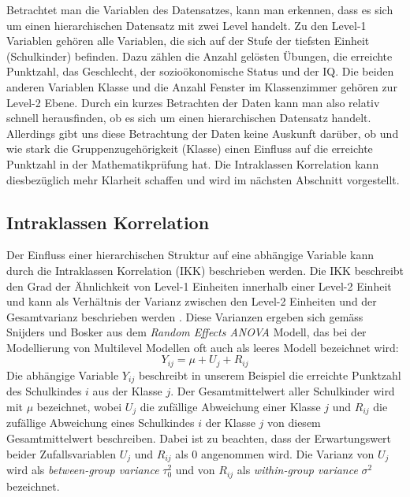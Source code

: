 \documentclass[12pt, a4paper]{article}\usepackage[]{graphicx}\usepackage[]{color}
\begin{document}
Betrachtet man die Variablen des Datensatzes, kann man erkennen, dass es sich um einen hierarchischen Datensatz mit zwei Level handelt. Zu den Level-1 Variablen gehören alle Variablen, die sich auf der Stufe der tiefsten Einheit (Schulkinder) befinden. Dazu zählen die Anzahl gelösten Übungen, die erreichte Punktzahl, das Geschlecht, der sozioökonomische Status und der IQ. Die beiden anderen Variablen Klasse und die Anzahl Fenster im Klassenzimmer gehören zur Level-2 Ebene. Durch ein kurzes Betrachten der Daten kann man also relativ schnell herausfinden, ob es sich um einen hierarchischen Datensatz handelt. Allerdings gibt uns diese Betrachtung der Daten keine Auskunft darüber, ob und wie stark die Gruppenzugehörigkeit (Klasse) einen Einfluss auf die erreichte Punktzahl in der Mathematikprüfung hat. Die Intraklassen Korrelation kann diesbezüglich mehr Klarheit schaffen und wird im nächsten Abschnitt vorgestellt.


\subsection{Intraklassen Korrelation} \label{section:icc}
Der Einfluss einer hierarchischen Struktur auf eine abhängige Variable kann durch die Intraklassen Korrelation (IKK) beschrieben werden. Die IKK beschreibt den Grad der Ähnlichkeit von Level-1 Einheiten innerhalb einer Level-2 Einheit und kann als Verhältnis der Varianz zwischen den Level-2 Einheiten und der Gesamtvarianz beschrieben werden \citep{FieldAndy2013DsuR, SnijdersTomA.B2012Ma:a, twisk_2006}. Diese Varianzen ergeben sich gemäss Snijders und Bosker \citeyearpar{SnijdersTomA.B2012Ma:a} aus dem \textit{Random Effects ANOVA} Modell, das bei der Modellierung von Multilevel Modellen oft auch als leeres Modell bezeichnet wird:
\begin{equation} \label{eq:empty_model}
Y_{ij} = \mu + U_{j} + R_{ij}
\end{equation}
Die abhängige Variable $Y_{ij}$ beschreibt in unserem Beispiel die erreichte Punktzahl des Schulkindes $i$ aus der Klasse $j$. Der Gesamtmittelwert aller Schulkinder wird mit $\mu$ bezeichnet, wobei $U_{j}$ die zufällige Abweichung einer Klasse $j$ und $R_{ij}$ die zufällige Abweichung eines Schulkindes $i$ der Klasse $j$ von diesem Gesamtmittelwert beschreiben. Dabei ist zu beachten, dass der Erwartungswert beider Zufallsvariablen $U_{j}$ und $R_{ij}$ als 0 angenommen wird. Die Varianz von $U_{j}$ wird als \textit{between-group variance} $\tau_{0}^2$ und von $R_{ij}$ als \textit{within-group variance} $\sigma^2$ bezeichnet.
\end{document}
